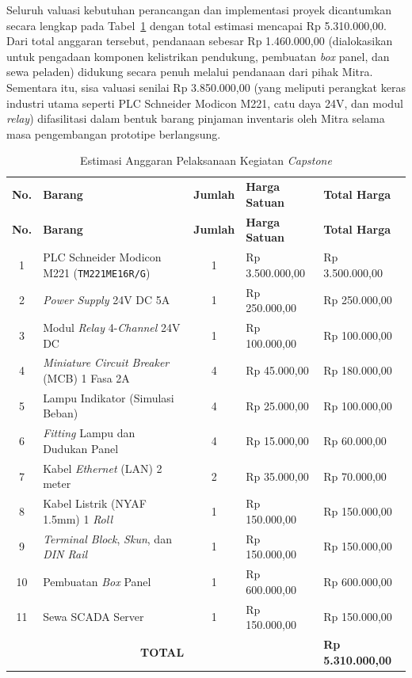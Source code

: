 Seluruh valuasi kebutuhan perancangan dan implementasi proyek dicantumkan secara lengkap pada Tabel~\ref{tab:anggaran} dengan total estimasi mencapai Rp 5.310.000,00. Dari total anggaran tersebut, pendanaan sebesar Rp 1.460.000,00 (dialokasikan untuk pengadaan komponen kelistrikan pendukung, pembuatan \textit{box} panel, dan sewa peladen) didukung secara penuh melalui pendanaan dari pihak Mitra. Sementara itu, sisa valuasi senilai Rp 3.850.000,00 (yang meliputi perangkat keras industri utama seperti PLC Schneider Modicon M221, catu daya 24V, dan modul \textit{relay}) difasilitasi dalam bentuk barang pinjaman inventaris oleh Mitra selama masa pengembangan prototipe berlangsung.
\begin{longtable}{|c|p{6.5cm}|c|p{2.8cm}|p{3.0cm}|}
    \caption{Estimasi Anggaran Pelaksanaan Kegiatan \textit{Capstone}}
    \label{tab:anggaran}
    \vspace{-0.75em}\\
    \hline
    \textbf{No.} & \centering\textbf{Barang} & \textbf{Jumlah} & \textbf{Harga Satuan} & \textbf{Total Harga} \\ \hline
    \endfirsthead
    \hline
    \textbf{No.} & \centering\textbf{Barang} & \textbf{Jumlah} & \textbf{Harga Satuan} & \textbf{Total Harga} \\ \hline
    \endhead
    1 & PLC Schneider Modicon M221 (\texttt{TM221ME16R/G}) & 1 & Rp 3.500.000,00 & Rp 3.500.000,00 \\ \hline
    2 & \textit{Power Supply} 24V DC 5A & 1 & Rp 250.000,00 & Rp 250.000,00 \\ \hline
    3 & Modul \textit{Relay} 4-\textit{Channel} 24V DC & 1 & Rp 100.000,00 & Rp 100.000,00 \\ \hline
    4 & \textit{Miniature Circuit Breaker} (MCB) 1 Fasa 2A & 4 & Rp 45.000,00 & Rp 180.000,00 \\ \hline
    5 & Lampu Indikator (Simulasi Beban) & 4 & Rp 25.000,00 & Rp 100.000,00 \\ \hline
    6 & \textit{Fitting} Lampu dan Dudukan Panel & 4 & Rp 15.000,00 & Rp 60.000,00 \\ \hline
    7 & Kabel \textit{Ethernet} (LAN) 2 meter & 2 & Rp 35.000,00 & Rp 70.000,00 \\ \hline
    8 & Kabel Listrik (NYAF 1.5mm) 1 \textit{Roll} & 1 & Rp 150.000,00 & Rp 150.000,00 \\ \hline
    9 & \textit{Terminal Block}, \textit{Skun}, dan \textit{DIN Rail} & 1 & Rp 150.000,00 & Rp 150.000,00 \\ \hline
    10 & Pembuatan \textit{Box} Panel & 1 & Rp 600.000,00 & Rp 600.000,00 \\ \hline
    11 & Sewa SCADA Server & 1 & Rp 150.000,00 & Rp 150.000,00 \\ \hline
    \multicolumn{4}{|c|}{\textbf{TOTAL}} & \textbf{Rp 5.310.000,00} \\ \hline
\end{longtable}
